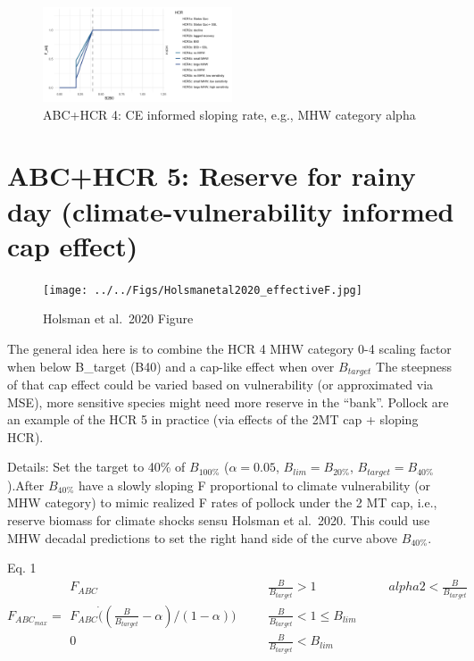 \documentclass[
]{article}
\begin{document}
\begin{figure}
\centering
\includegraphics[width=0.5\textwidth,height=\textheight]{../../Figs/HCR_figs/HCR4.png}
\caption{ABC+HCR 4: CE informed sloping rate, e.g., MHW category alpha}
\end{figure}

\section{ABC+HCR 5: Reserve for rainy day (climate-vulnerability
informed cap
effect)}\label{abchcr-5-reserve-for-rainy-day-climate-vulnerability-informed-cap-effect}

\begin{figure}
\centering
\texttt{[image: ../../Figs/Holsmanetal2020\_effectiveF.jpg]}
\caption{Holsman et al.~2020 Figure}
\end{figure}

The general idea here is to combine the HCR 4 MHW category 0-4 scaling
factor when below B\_target (B40) and a cap-like effect when over
\(B_{target}\) The steepness of that cap effect could be varied based on
vulnerability (or approximated via MSE), more sensitive species might
need more reserve in the ``bank''. Pollock are an example of the HCR 5
in practice (via effects of the 2MT cap + sloping HCR).

Details: Set the target to 40\% of \(B_{100\%}\) (\(\alpha = 0.05\),
\(B_{lim} = B_{20\%}\), \(B_{target} = B_{40\%}\)).After \(B_{40\%}\)
have a slowly sloping F proportional to climate vulnerability (or MHW
category) to mimic realized F rates of pollock under the 2 MT cap, i.e.,
reserve biomass for climate shocks sensu Holsman et al.~2020. This could
use MHW decadal predictions to set the right hand side of the curve
above \(B_{40\%}\).

Eq. 1 \[F_{ABC_{max}} = \begin{array}{lrl}  
 F_{ABC} &~~~~~~~~ \frac{B}{B_{target}}>1  &~~~~~~~~ alpha2 < \frac{B}{B_{target}}\\  
 F_{ABC}\dot((\frac{B}{B_{target}}-\alpha)/(1-\alpha)) &~~~~~~~~ \frac{B}{B_{target}} < 1 \leq B_{lim} \\  
 0 &~~~~~~~~ \frac{B}{B_{target}} < B_{lim}  
 \end{array}\]
\end{document}
